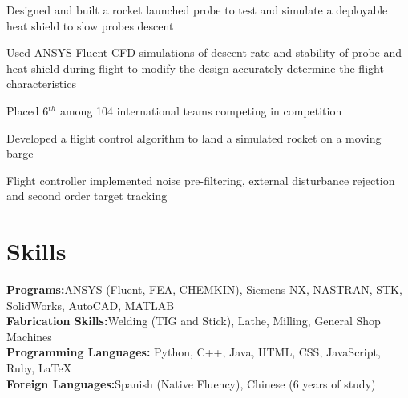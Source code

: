 \documentclass[letterpaper,11pt]{cv_format}
\begin{document}
\begin{c_itemize}
    \item Designed and built a rocket launched probe to test and simulate a deployable heat shield to slow probes descent 
    \item Used ANSYS Fluent CFD simulations of descent rate and stability of probe and heat shield during flight to modify the design accurately determine the flight characteristics
    \item Placed 6$^{th}$ among 104 international teams competing in competition
\end{c_itemize}

\begin{c_itemize}
    \item Developed a flight control algorithm to land a simulated rocket on a moving barge
    \item Flight controller implemented noise pre-filtering, external disturbance rejection and second order target tracking
\end{c_itemize}


\section{Skills}
\textbf{Programs:}ANSYS (Fluent, FEA, CHEMKIN), Siemens NX, NASTRAN, STK, SolidWorks, AutoCAD, MATLAB \\
\textbf{Fabrication Skills:}Welding (TIG and Stick), Lathe, Milling, General Shop Machines\\
\textbf{Programming Languages:} Python, C++, Java, HTML, CSS,  JavaScript, Ruby, {\scriptsize \LaTeX}\\
\textbf{Foreign Languages:}Spanish (Native Fluency), Chinese (6 years of study)
\end{document}

